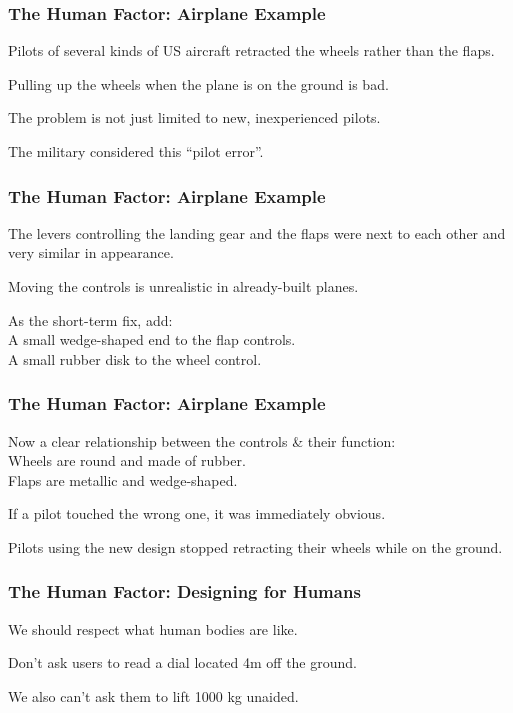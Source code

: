 \begin{frame}
\frametitle{The Human Factor: Airplane Example}
\begin{changemargin}{1cm}

Pilots of several kinds of US aircraft retracted the wheels rather than the flaps.

Pulling up the wheels when the plane is on the ground is bad.

The problem is not just limited to new, inexperienced pilots.

The military considered this ``pilot error''.

\end{changemargin}
\end{frame}

\begin{frame}
\frametitle{The Human Factor: Airplane Example}
\begin{changemargin}{1cm}

The levers controlling the landing gear and the flaps were next to each other and very similar in appearance.

Moving the controls is unrealistic in already-built planes.

As the short-term fix, add:\\
\quad A small wedge-shaped end to the flap controls.\\
\quad A small rubber disk to the wheel control.

\end{changemargin}
\end{frame}


\begin{frame}
\frametitle{The Human Factor: Airplane Example}
\begin{changemargin}{1cm}

Now a clear relationship between the controls \& their function:\\
\quad Wheels are round and made of rubber. \\
\quad Flaps are metallic and wedge-shaped.

If a pilot touched the wrong one, it was immediately obvious. 

Pilots using the new design stopped retracting their wheels while on the ground.

\end{changemargin}
\end{frame}

\begin{frame}
\frametitle{The Human Factor: Designing for Humans}
\begin{changemargin}{1cm}
We should respect what human bodies are like.

Don't ask users to read a dial located 4m off the ground.

We also can't ask them to lift 1000 kg unaided.

\end{changemargin}
\end{frame}

